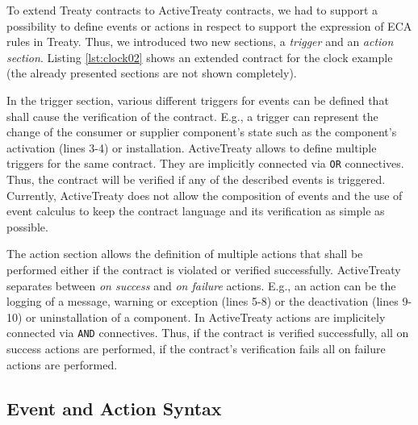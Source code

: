 \documentclass{llncs}
\begin{document}
\begin{figure}[htbp]
\lstset{ 
  language=XML,
  caption=A contract for the clock example.,
  label=lst:clock01
}

\end{figure}

To extend Treaty contracts to ActiveTreaty contracts, we had to support a possibility to define events or actions in respect to support the expression of ECA rules in Treaty. Thus, we introduced two new sections, a \textit{trigger} and an \textit{action section}. Listing \ref{lst:clock02} shows an extended contract for the clock example (the already presented sections are not shown completely).

\begin{figure}[htbp]
\lstset{ 
  language=XML,
  caption=A contract for the clock example including triggers and actions.,
  label=lst:clock02
}

\end{figure}

In the trigger section, various different triggers for events can be defined that shall cause the verification of the contract. E.g., a trigger can represent the change of the consumer or supplier component's state such as the component's activation (lines 3-4) or installation. ActiveTreaty allows to define multiple triggers for the same contract. They are implicitly connected via \texttt{OR} connectives. Thus, the contract will be verified if any of the described events is triggered. Currently, ActiveTreaty does not allow the composition of events and the use of event calculus to keep the contract language and its verification as simple as possible.

The action section allows the definition of multiple actions that shall be performed either if the contract is violated or verified successfully. ActiveTreaty separates between \textit{on success} and \textit{on failure} actions. E.g., an action can be the logging of a message, warning or exception (lines 5-8) or the deactivation (lines 9-10) or uninstallation of a component. In ActiveTreaty actions are implicitely connected via \texttt{AND} connectives. Thus, if the contract is verified successfully, all on success actions are performed, if the contract's verification fails all on failure actions are performed.
	


\subsection{Event and Action Syntax} 
\end{document}
